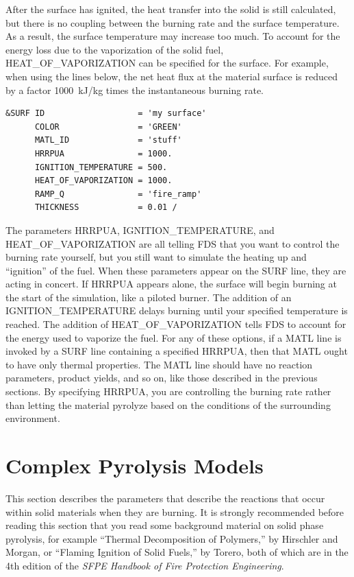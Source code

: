 \documentclass[11pt]{book}
\begin{document}
After the surface has ignited, the heat transfer into the solid is
still calculated, but there is no coupling between the burning rate
and the surface temperature. As a result, the surface temperature may
increase too much. To account for the energy loss due to the
vaporization of the solid fuel, {\ct HEAT\_OF\_VAPORIZATION} can be
specified for the surface. For example, when using the lines below,
the net heat flux at the material surface is reduced by a factor
1000~kJ/kg times the instantaneous burning rate.
\begin{lstlisting}
&SURF ID                   = 'my surface'
      COLOR                = 'GREEN'
      MATL_ID              = 'stuff'
      HRRPUA               = 1000.
      IGNITION_TEMPERATURE = 500.
      HEAT_OF_VAPORIZATION = 1000.
      RAMP_Q               = 'fire_ramp'
      THICKNESS            = 0.01 /
\end{lstlisting}
The parameters {\ct HRRPUA}, {\ct IGNITION\_TEMPERATURE}, and {\ct HEAT\_OF\_VAPORIZATION} are all telling FDS that you want to control the
burning rate yourself, but you still want to simulate the heating up and ``ignition'' of the fuel. When these parameters appear on the {\ct SURF} line, they
are acting in concert. If {\ct HRRPUA} appears alone, the surface will begin burning at the start of the simulation, like a piloted burner. The addition of
an {\ct IGNITION\_TEMPERATURE} delays burning until your specified temperature is reached. The addition of {\ct HEAT\_OF\_VAPORIZATION}
tells FDS to account for the energy used to vaporize the fuel. For any of these options, if a {\ct MATL} line is invoked by a {\ct SURF} line containing
a specified {\ct HRRPUA}, then that {\ct MATL} ought to have only thermal properties. The {\ct MATL} line should have no reaction parameters, product yields, and so on, like
those described in the previous sections. By specifying {\ct HRRPUA}, you are controlling the burning rate rather than letting the material pyrolyze based on
the conditions of the surrounding environment.






\section{Complex Pyrolysis Models}
\label{info:solid_pyrolysis}

This section describes the parameters that describe the reactions that occur within solid
materials when they are burning. It is strongly recommended before reading this section that you read some background material on
solid phase pyrolysis, for example ``Thermal Decomposition of Polymers,'' by Hirschler and Morgan, or
``Flaming Ignition of Solid Fuels,'' by Torero, both of which are in the 4th edition of the
{\em SFPE Handbook of Fire Protection Engineering}.
\end{document}
